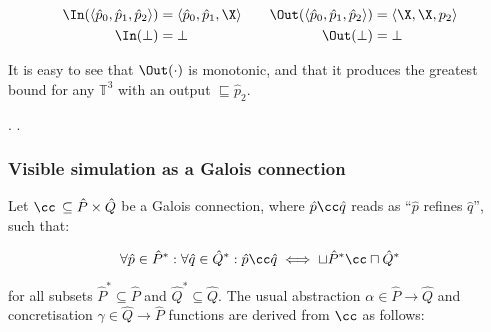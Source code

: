 

\begin{equation*}
\begin{aligned}[t]
\In(\langle \hat p_{0}, \hat p_{1}, \hat p_{2} \rangle) &= \langle \hat p_{0}, \hat p_{1}, \X \rangle \\
\In(\bot) &= \bot
\end{aligned}
\qquad
\begin{aligned}[t]
\Out(\langle \hat p_{0}, \hat p_{1}, \hat p_{2} \rangle) &= \langle \X, \X, p_{2} \rangle \\
\Out(\bot) &= \bot
\end{aligned}
\end{equation*}

\noindent It is easy to see that $\Out(\cdot)$ is monotonic, and that it produces the greatest bound for any $\mathbb{T}^{3}$ with an output $\sqsubseteq \hat p_{2}$.

. .


\subsubsection{Visible simulation as a Galois connection}

Let $\cc \, \subseteq \hat P \times \hat Q$ be a Galois connection, where $\hat p \cc \hat q$ reads as ``$\hat p$ refines $\hat q$'', such that:

\begin{equation*}
\forall \hat p \in \hat P^{*} : \forall \hat q \in \hat Q^{*} : \hat p \cc \hat q \iff \sqcup \hat P^{*} \cc \sqcap \hat Q^{*}
\end{equation*}

\noindent for all subsets $\hat P^{*} \subseteq \hat P$ and $\hat Q^{*} \subseteq \hat Q$. The usual abstraction $\alpha \in \hat P \rightarrow \hat Q$ and concretisation $\gamma \in \hat Q \rightarrow \hat P$ functions are derived from $\cc$ as follows:

